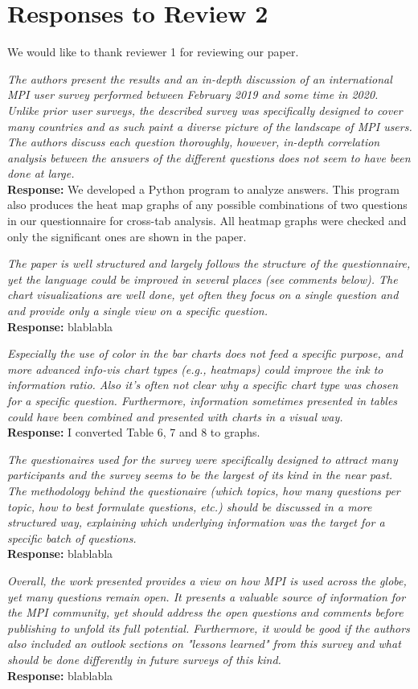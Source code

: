 \documentclass[11pt]{article}
\newcommand{\response}[2]{{\vspace{5mm}\noindent{\bf Comment:} \em #1}\\%
  {\bf Response:} #2}
\begin{document}
\section*{Responses to Review 2}

We would like to thank reviewer 1 for reviewing our paper.

\response{The authors present the results and an in-depth discussion
  of an international MPI user survey performed between February 2019
  and some time in 2020. Unlike prior user surveys, the described
  survey was specifically designed to cover many countries and as such
  paint a diverse picture of the landscape of MPI users. The authors
  discuss each question thoroughly, however, in-depth correlation
  analysis between the answers of the different questions does not
  seem to have been done at large.}
 {
We developed a Python program to analyze answers. This program also
produces the heat map graphs of any possible combinations of two
questions in our questionnaire for cross-tab analysis. All heatmap
graphs were checked and only the significant ones are shown in the
paper. 
 }


\response{The paper is well structured and largely follows the
  structure of the questionnaire, yet the language could be improved
  in several places (see comments below). The chart visualizations are
  well done, yet often they focus on a single question and and provide
  only a single view on a specific question.}
{
 blablabla          
}


\response{Especially the use of color in the bar charts does not feed
  a specific purpose, and more advanced info-vis chart types (e.g.,
  heatmaps) could improve the ink to information ratio.
  Also it's often not clear why a specific chart type was
  chosen for a specific question. Furthermore, information sometimes
  presented in tables could have been combined and presented with
  charts in a visual way.}
{I converted Table 6, 7 and 8 to graphs.}

\response{The questionaires used for the survey were specifically
  designed to attract many participants and the survey seems to be the
  largest of its kind in the near past. The methodology behind the
  questionaire (which topics, how many questions per topic, how to
  best formulate questions, etc.) should be discussed in a more
  structured way, explaining which underlying information was the
  target for a specific batch of questions.}
         {
           blablabla
}

\response{Overall, the work presented provides a view on how MPI is
  used across the globe, yet many questions remain open. It presents a
  valuable source of information for the MPI community, yet should
  address the open questions and comments before publishing to unfold
  its full potential. Furthermore, it would be good if the authors
  also included an outlook sections on "lessons learned" from this
  survey and what should be done differently in future surveys of this
  kind.}
         {
           blablabla
}
\end{document}
